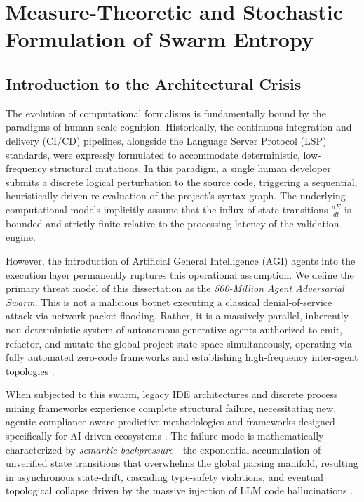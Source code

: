 \chapter{Measure-Theoretic and Stochastic Formulation of Swarm Entropy}
\label{ch:problem_formulation}

\section{Introduction to the Architectural Crisis}

The evolution of computational formalisms is fundamentally bound by the paradigms of human-scale cognition. Historically, the continuous-integration and delivery (CI/CD) pipelines, alongside the Language Server Protocol (LSP) standards, were expressly formulated to accommodate deterministic, low-frequency structural mutations. In this paradigm, a single human developer submits a discrete logical perturbation to the source code, triggering a sequential, heuristically driven re-evaluation of the project's syntax graph. The underlying computational models implicitly assume that the influx of state transitions $\frac{dE}{dt}$ is bounded and strictly finite relative to the processing latency of the validation engine. 

However, the introduction of Artificial General Intelligence (AGI) agents into the execution layer permanently ruptures this operational assumption. We define the primary threat model of this dissertation as the \textit{500-Million Agent Adversarial Swarm}. This is not a malicious botnet executing a classical denial-of-service attack via network packet flooding. Rather, it is a massively parallel, inherently non-deterministic system of autonomous generative agents authorized to emit, refactor, and mutate the global project state space simultaneously, operating via fully automated zero-code frameworks \cite{autoagent_2024} and establishing high-frequency inter-agent topologies \cite{agent_tcp_ip_2025}. 

When subjected to this swarm, legacy IDE architectures and discrete process mining frameworks experience complete structural failure, necessitating new, agentic compliance-aware predictive methodologies \cite{compliance_predictive_process_2024} and frameworks designed specifically for AI-driven ecosystems \cite{pmax_agentic_process_mining_2024}. The failure mode is mathematically characterized by \textit{semantic backpressure}---the exponential accumulation of unverified state transitions that overwhelms the global parsing manifold, resulting in asynchronous state-drift, cascading type-safety violations, and eventual topological collapse driven by the massive injection of LLM code hallucinations \cite{code_hallucinations_llm_2024}.

